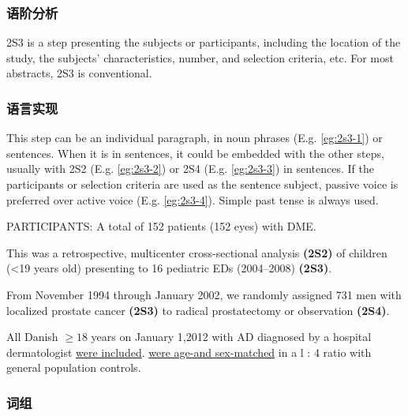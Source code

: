 \documentclass[a4paper]{ctexbook}
\begin{document}
    \subsubsection{语阶分析}

    2S3 is a step presenting the subjects or participants, including the location of the study, the subjects' characteristics, number, and selection criteria, etc. For most abstracts, 2S3 is conventional.

    \subsubsection{语言实现}

    This step can be an individual paragraph, in noun phrases (E.g. \ref{eg:2s3-1}) or sentences. When it is in sentences, it could be embedded with the other steps, usually with 2S2 (E.g. \ref{eg:2s3-2}) or 2S4 (E.g. \ref{eg:2s3-3}) in sentences. If the participants or selection criteria are used as the sentence subject, passive voice is preferred over active voice (E.g. \ref{eg:2s3-4}). Simple past tense is always used.

    \begin{eg}[label={eg:2s3-1}]{}
      PARTICIPANTS: A total of 152 patients (152 eyes) with DME.
    \end{eg}

    \begin{eg}[label={eg:2s3-2}]{}
      This was a retrospective, multicenter cross-sectional analysis \textbf{(2S2)} of children (<19 years old) presenting to 16 pediatric EDs (2004--2008) \textbf{(2S3)}.
    \end{eg}

    \begin{eg}[label={eg:2s3-3}]{}
      From November 1994 through January 2002, we randomly assigned 731 men with localized prostate cancer \textbf{(2S3)} to radical prostatectomy or observation \textbf{(2S4)}.
    \end{eg}

    \begin{eg}[label={eg:2s3-4}]{}
      All Danish  $\geqslant 18$ years on January 1,2012 with AD diagnosed by a hospital dermatologist \uline{were included}.  \uline{were age-and sex-matched} in a l : 4 ratio with general population controls.
    \end{eg}

    \subsubsection{词组}
\end{document}
